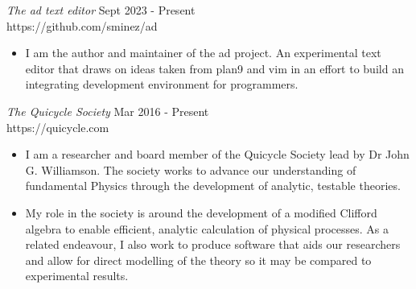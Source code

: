 \documentclass[margin]{res}
\begin{document}
\begin{resume}
{\sl The ad text editor} \hfill Sept 2023 - Present \\
https://github.com/sminez/ad
\begin{itemize}  \itemsep -2pt %
  \item I am the author and maintainer of the ad project. An experimental
        text editor that draws on ideas taken from plan9 and vim in an effort
        to build an integrating development environment for programmers.
\end{itemize}

{\sl The Quicycle Society} \hfill Mar 2016 - Present \\
https://quicycle.com
\begin{itemize}  \itemsep -2pt %
  \item I am a researcher and board member of the Quicycle Society lead by
        Dr John G. Williamson. The society works to advance our understanding
        of fundamental Physics through the development of analytic, testable
        theories.
  \item My role in the society is around the development of a modified Clifford
        algebra to enable efficient, analytic calculation of physical processes.
        As a related endeavour, I also work to produce software that aids our
        researchers and allow for direct modelling of the theory so it may be
        compared to experimental results.
\end{itemize}

\end{resume}
\end{document}
